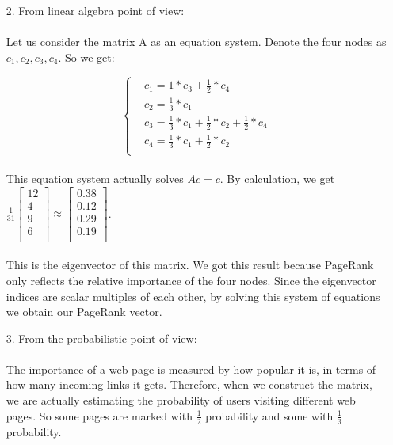 \documentclass[12pt]{article}
\begin{document}
\begin{itemize}
    \item[2.] From linear algebra point of view: 
    \paragraph{}Let us consider the matrix A as an equation system. Denote the four nodes as $c_1, c_2, c_3, c_4$. So we get:

\begin{equation*}
  \left\{
    \begin{aligned}
      & c_1 = 1 * c_3 + \frac{1}{2} * c_4 \\
      & c_2 = \frac{1}{3} * c_1 \\
      & c_3 = \frac{1}{3} * c_1 + \frac{1}{2} * c_2 + \frac{1}{2} * c_4 \\
      & c_4 = \frac{1}{3} * c_1 + \frac{1}{2} * c_2 \\
    \end{aligned}
  \right.
\end{equation*}

\paragraph{}This equation system actually solves $Ac = c$. By calculation, we get $\frac{1}{31}\begin{bmatrix}12 \\4 \\9 \\6 \\\end{bmatrix} \approx \begin{bmatrix}0.38 \\0.12 \\0.29 \\0.19 \\\end{bmatrix}$. 
\paragraph{}This is the eigenvector of this matrix. We got this result because PageRank only reflects the relative importance of the four nodes. Since the eigenvector indices are scalar multiples of each other, by solving this system of equations we obtain our PageRank vector.
    \item[3.] From the probabilistic point of view:
\paragraph{}The importance of a web page is measured by how popular it is, in terms of how many incoming links it gets. Therefore, when we construct the matrix, we are actually estimating the probability of users visiting different web pages. So some pages are marked with $\frac{1}{2}$ probability and some with $\frac{1}{3}$ probability.

\end{itemize}
\end{document}
